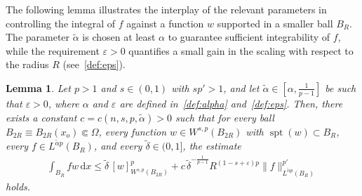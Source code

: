 \documentclass[10pt,letterpaper]{amsart}
\newtheorem{lemma}[theorem]{Lemma}
\theoremstyle{definition}
\numberwithin{theorem}{section}
\numberwithin{equation}{section}
\newcommand{\1}{\ensuremath{\mathds{1}}}
\renewcommand{\epsilon}{\varepsilon}
\renewcommand{\epsilon}{\varepsilon}
\numberwithin{equation}{section}
\begin{document}
The following lemma illustrates the interplay of the relevant parameters in controlling the integral of $f$ against a function $w$ supported in a smaller ball $B_R$. The parameter $\tilde\alpha$ is chosen at least $\alpha$ to guarantee sufficient integrability of $f$, while the requirement $\varepsilon>0$ quantifies a small gain in the scaling with respect to the radius $R$ (see~\eqref{def:eps}).

\begin{lemma}\label{lem:fw}
Let $p>1$ and $s\in(0,1)$ with $sp'>1$, and let $\tilde\alpha\in[\alpha,\frac{1}{p-1}]$ be such that $\epsilon>0$, where $\alpha$ and $\epsilon$ are defined in~\eqref{def:alpha} and~\eqref{def:eps}. 
Then, there exists a constant
$c=c(n,s,p,\tilde\alpha)>0$ such that for every ball
$B_{2R}\equiv B_{2R}(x_o)\Subset\Omega$, every function
$w\in W^{s,p}(B_{2R})$ with $\operatorname{spt} (w)\subset B_R$,
every $f\in L^{\tilde\alpha p}(B_R)$, and every $\tilde\delta\in(0,1]$,
the estimate
\begin{align*}
    \int_{B_R} f w \,\mathrm{d}x
    \le
    \tilde\delta\,[w]_{W^{s,p}(B_{2R})}^p
    +
    c\,\tilde\delta^{-\frac{1}{p-1}} R^{(1-s+\varepsilon)p}
    \|f\|_{L^{\tilde\alpha p}(B_R)}^{p'}
\end{align*}
holds.
\end{lemma}
\end{document}

